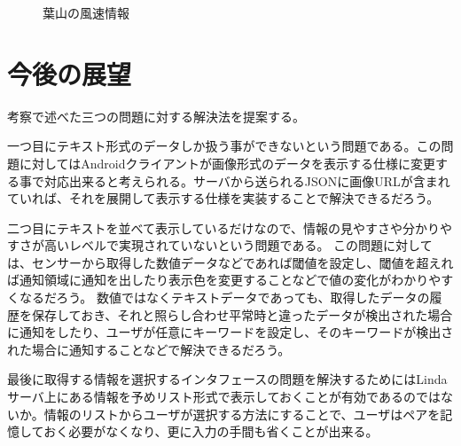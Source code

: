 \begin{figure}[htbp]
  \begin{minipage}{\hsize}
    \begin{center}
    \end{center}
    \caption{葉山の風速情報}
    \label{fig:hayama_wind}
  \end{minipage}
\end{figure}

\section{今後の展望}

考察で述べた三つの問題に対する解決法を提案する。

一つ目にテキスト形式のデータしか扱う事ができないという問題である。この問題に対してはAndroidクライアントが画像形式のデータを表示する仕様に変更する事で対応出来ると考えられる。サーバから送られるJSONに画像URLが含まれていれば、それを展開して表示する仕様を実装することで解決できるだろう。

二つ目にテキストを並べて表示しているだけなので、情報の見やすさや分かりやすさが高いレベルで実現されていないという問題である。
この問題に対しては、センサーから取得した数値データなどであれば閾値を設定し、閾値を超えれば通知領域に通知を出したり表示色を変更することなどで値の変化がわかりやすくなるだろう。
数値ではなくテキストデータであっても、取得したデータの履歴を保存しておき、それと照らし合わせ平常時と違ったデータが検出された場合に通知をしたり、ユーザが任意にキーワードを設定し、そのキーワードが検出された場合に通知することなどで解決できるだろう。

最後に取得する情報を選択するインタフェースの問題を解決するためにはLindaサーバ上にある情報を予めリスト形式で表示しておくことが有効であるのではないか。情報のリストからユーザが選択する方法にすることで、ユーザはペアを記憶しておく必要がなくなり、更に入力の手間も省くことが出来る。
